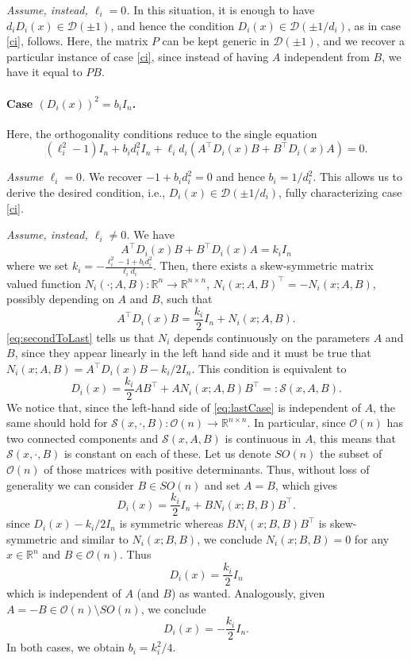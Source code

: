 \documentclass{article}
\newcommand{\R}{\mathbb{R}}
\theoremstyle{plain}
\theoremstyle{definition}
\theoremstyle{definition}
\theoremstyle{remark}
\theoremstyle{definition}
\theoremstyle{definition}
\theoremstyle{remark}
\numberwithin{equation}{section}
\begin{document}
\textit{Assume, instead, $\ell_i=0$.} In this situation, it is enough to have $d_iD_i(x)\in\mathcal{D}(\pm 1)$, and hence the condition $D_i(x)\in\mathcal{D}(\pm 1/d_i)$, as in case \ref{ci}, follows. Here, the matrix $P$ can be kept generic in $\mathcal{D}(\pm 1)$, and we recover a particular instance of case \ref{ci}, since instead of having $A$ independent from $B$, we have it equal to $PB$.

\paragraph{Case $(D_i(x))^2=b_i I_n$.} Here, the orthogonality conditions reduce to the single equation
\begin{equation}\label{eq:simplifiedEq}
(\ell^2_i - 1) I_n + b_id_i^2I_n + \ell_i d_i(A^\top D_i(x)B + B^\top D_i(x)A) = 0.
\end{equation}

\textit{Assume $\ell_i=0$.} We recover $-1+b_id_i^2=0$ and hence $b_i = 1/d_i^2$. This allows us to derive the desired condition, i.e., $D_i(x)\in\mathcal{D}(\pm 1/d_i)$, fully characterizing case \ref{ci}.

\textit{Assume, instead, $\ell_i\neq 0$.} We have
\begin{equation*}
A^\top D_i(x)B + B^\top D_i(x)A = k_iI_n
\end{equation*}
where we set $k_i = -\frac{\ell_i^2 - 1 + b_id_i^2}{\ell_i d_i}$. Then, there exists a skew-symmetric matrix valued function $N_{i}(\cdot;A,B):\R^n\to\R^{n\times n}$, $N_i(x;A,B)^\top =-N_i(x;A,B)$, possibly depending on $A$ and $B$, such that
\begin{equation}\label{eq:secondToLast}
A^\top D_i(x)B = \frac{k_i}{2}I_n + N_i(x;A,B).
\end{equation}
\eqref{eq:secondToLast} tells us that $N_i$ depends continuously on the parameters $A$ and $B$, since they appear linearly in the left hand side and it must be true that $N_i(x;A,B)=A^\top D_i(x)B-k_i/2 I_n$. This condition is equivalent to
\begin{equation}\label{eq:lastCase}
D_i(x) = \frac{k_i}{2}AB^\top + AN_i(x;A,B)B^\top =: \mathscr{S}(x, A, B).
\end{equation}
We notice that, since the left-hand side of \eqref{eq:lastCase} is independent of $A$, the same should hold for $\mathscr{S}(x, \cdot, B): \mathcal{O}(n) \to \mathbb{R}^{n \times n}$. In particular, since $\mathcal{O}(n)$ has two connected components and $\mathscr{S}(x, A, B)$ is continuous in $A$, this means that $\mathscr{S}(x, \cdot, B)$ is constant on each of these. Let us denote $SO(n)$ the subset of $\mathcal{O}(n)$ of those matrices with positive determinants. Thus, without loss of generality we can consider $B \in SO(n)$ and set $A=B$, which gives
\[
D_i(x) = \frac{k_i}{2}I_n + BN_i(x;B,B)B^\top.
\]
since $D_i(x)-k_i/2 I_n$ is symmetric whereas $BN_i(x;B,B)B^\top$ is skew-symmetric and similar to $N_i(x;B,B)$, we conclude $N_i(x;B,B)=0$ for any $x\in\mathbb{R}^n$ and $B\in\mathcal{O}(n)$. Thus 
\[
D_i(x) = \frac{k_i}{2}I_n
\]
which is independent of $A$ (and $B$) as wanted. Analogously, given $A = -B \in \mathcal{O}(n) \setminus SO(n)$, we conclude
\[
D_i(x) = -\frac{k_i}{2}I_n.
\]
In both cases, we obtain $b_i = k_i^2/4$.
\end{document}
